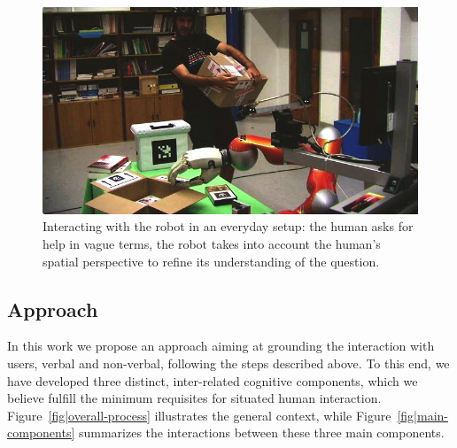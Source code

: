 \documentclass[twocolumn]{svjour3}
\newcommand{\ie}{{\textit{i.e.~}}}
\begin{document}


\begin{figure}%
	\centering
	\includegraphics[width=1.0\linewidth]{images/pt.jpg} 
	\caption{Interacting with
	the robot in an everyday setup: the human asks for help in vague terms, the
	robot takes into account the human's spatial perspective to refine its
	understanding of the question.} 
	\label{fig|vpt} 
\end{figure}



\subsection{Approach}

In this work we propose an approach aiming at grounding the interaction with users, verbal and non-verbal, following the steps described above. To this end, we have developed three distinct, inter-related cognitive components, which we believe fulfill the minimum requisites for situated human interaction. Figure~\ref{fig|overall-process} illustrates the general context, while
Figure~\ref{fig|main-components} summarizes the interactions between these three
main components.
\end{document}
